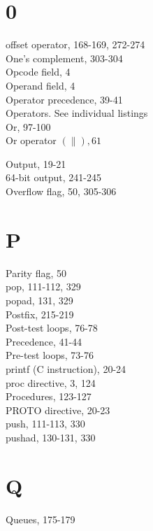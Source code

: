 \documentclass[10pt]{book}
\begin{document}
\begin{center}
\begin{center}
\begin{center}
\begin{center}
\begin{center}
\section*{0}
offset operator, 168-169, 272-274\\
One's complement, 303-304\\
Opcode field, 4\\
Operand field, 4\\
Operator precedence, 39-41\\
Operators. See individual listings\\
Or, 97-100\\
Or operator $(\|), 61$

Output, 19-21\\
64-bit output, 241-245\\
Overflow flag, 50, 305-306

\section*{P}
Parity flag, 50\\
pop, 111-112, 329\\
popad, 131, 329\\
Postfix, 215-219\\
Post-test loops, 76-78\\
Precedence, 41-44\\
Pre-test loops, 73-76\\
printf (C instruction), 20-24\\
proc directive, 3, 124\\
Procedures, 123-127\\
PROTO directive, 20-23\\
push, 111-113, 330\\
pushad, 130-131, 330

\section*{Q}
Queues, 175-179


\end{center}
\end{center}
\end{center}
\end{center}
\end{center}
\end{document}
